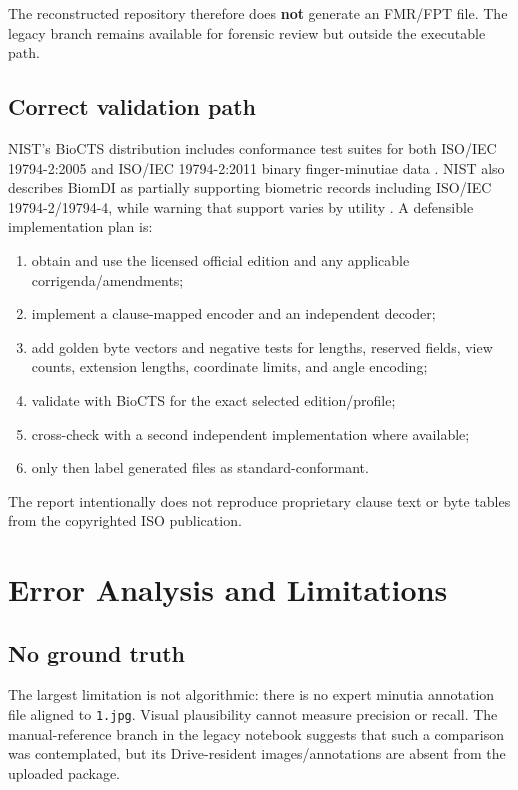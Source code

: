 \documentclass[11pt]{article}
\begin{document}
The reconstructed repository therefore does \textbf{not} generate an FMR/FPT file. The legacy branch remains available for forensic review but outside the executable path.

\subsection{Correct validation path}

NIST's BioCTS distribution includes conformance test suites for both ISO/IEC 19794-2:2005 and ISO/IEC 19794-2:2011 binary finger-minutiae data \cite{nistbiocts2026}. NIST also describes BiomDI as partially supporting biometric records including ISO/IEC 19794-2/19794-4, while warning that support varies by utility \cite{nistbiomdi}. A defensible implementation plan is:

\begin{enumerate}
  \item obtain and use the licensed official edition and any applicable corrigenda/amendments;
  \item implement a clause-mapped encoder and an independent decoder;
  \item add golden byte vectors and negative tests for lengths, reserved fields, view counts, extension lengths, coordinate limits, and angle encoding;
  \item validate with BioCTS for the exact selected edition/profile;
  \item cross-check with a second independent implementation where available;
  \item only then label generated files as standard-conformant.
\end{enumerate}

The report intentionally does not reproduce proprietary clause text or byte tables from the copyrighted ISO publication.

\section{Error Analysis and Limitations}

\subsection{No ground truth}

The largest limitation is not algorithmic: there is no expert minutia annotation file aligned to \texttt{1.jpg}. Visual plausibility cannot measure precision or recall. The manual-reference branch in the legacy notebook suggests that such a comparison was contemplated, but its Drive-resident images/annotations are absent from the uploaded package.
\end{document}
